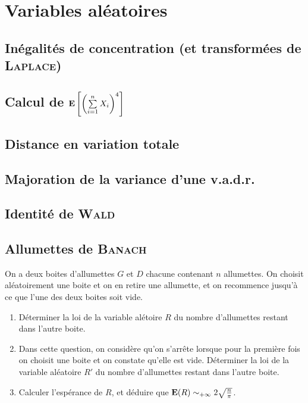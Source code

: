 \chapter{Variables aléatoires}

\section{Inégalités de concentration (et transformées de \textsc{Laplace})}


\section{Calcul de \texorpdfstring{$\mathbf{E} \left [ \left (\sum\limits_{i=1}^{n} X_i \right)^4 \right]$}{espérance de la somme puissance 4 de v.a.}}


\section{Distance en variation totale}


\section{Majoration de la variance d'une v.a.d.r.}


\section{Identité de \textsc{Wald}}


\section{Allumettes de \textsc{Banach}}
\begin{exercice}
    On a deux boites d'allumettes $G$ et $D$ chacune contenant $n$ allumettes. On choisit aléatoirement une boite et on en retire une allumette, et on recommence jusqu'à ce que l'une des deux boites soit vide.
    \begin{enumerate}
        \item Déterminer la loi de la variable alétoire $R$ du nombre d'allumettes restant dans l'autre boite.
        \item Dans cette question, on considère qu'on s'arrête lorsque pour la première fois on choisit une boite et on constate qu'elle est vide. Déterminer la loi de la variable aléatoire $R'$ du nombre d'allumettes restant dans l'autre boite.
        \item Calculer l'espérance de $R$, et déduire que $\E(R) \isEquivTo{+ \infty} 2 \sqrt{\frac{n}{\pi}}$.
    \end{enumerate}
\end{exercice}

